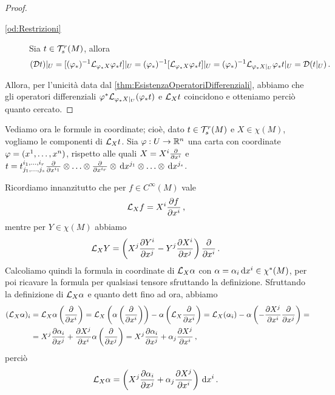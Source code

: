 \begin{proof}
\begin{description}
	\item [\ref{od:Restrizioni}]
		Sia $t\in\Tau_s^r(M)$, allora
		\begin{equation*}
			(\mathcal Dt)\restrict U = [(\varphi_*)^{-1} \Lie_{\varphi_*X}\varphi_*t]\restrict U 
			= (\varphi_*)^{-1}[\Lie_{\varphi_*X}\varphi_*t]\restrict U 
			= (\varphi_*)^{-1} \Lie_{\varphi_*X\restrict U}\varphi_*t \restrict U = \mathcal D(t\restrict U) \punto
		\end{equation*}
	\end{description}
	
	Allora, per l'unicità data dal \cref{thm:EsistenzaOperatoriDifferenziali}, abbiamo che gli operatori differenziali $\varphi^*\Lie_{\varphi_*X\restrict U}(\varphi_*t)$ e $\Lie_Xt$ coincidono e otteniamo perciò quanto cercato.
\end{proof}

Vediamo ora le formule in coordinate; cioè, dato $t\in\Tau_s^r(M)$ e $X\in\chi(M)$, vogliamo le componenti di $\Lie_Xt$.
Sia $\varphi: U \to \R^n$ una carta con coordinate $\varphi=(\seqa xn,)$, rispetto alle quali $X= X^i\DerParz{}{x^i}$ e $t = t^{\seqb ir,}_{\seqb js,} \DerParz{}{x^{i_1}} \otimes \ldots \otimes \DerParz{}{x^{i_r}} \otimes \de x^{j_1} \otimes \ldots \otimes \de x^{j_s}$.

Ricordiamo innanzitutto che per $f \in C^\infty(M)$ vale
\begin{equation*}
\Lie_X f = X^i \DerParz{f}{x^i} \virgola
\end{equation*}
mentre per $Y\in \chi(M)$ abbiamo
\begin{equation*}
\Lie_XY = \left( X^j\DerParz{Y^i}{x^j} - Y^j \DerParz{X^i}{x^j} \right) \DerParz{}{x^i}\punto
\end{equation*}
Calcoliamo quindi la formula in coordinate di $\Lie_X\alpha$ con $\alpha = \alpha_i \de x^i \in \chi^*(M)$, per poi ricavare la formula per qualsiasi tensore sfruttando la definizione. Sfruttando la definizione di $\Lie_X\alpha$ e quanto dett fino ad ora, abbiamo
\begin{align*}
	(\Lie_X\alpha)_i &= \Lie_X\alpha \left(\DerParz{}{x^i}\right) = \Lie_X \left(\alpha\left(\DerParz{}{x^i}\right)\right) - \alpha\left(\Lie_X\DerParz{}{x^i}\right) = \Lie_X(\alpha_i) - \alpha\left( - \DerParz{X^j}{x^i} \DerParz{}{x^j} \right) =  \\
	& = X^j \DerParz{\alpha_i}{x^j} + \DerParz{X^j}{x^i} \alpha\left( \DerParz{}{x^j} \right) = X^j \DerParz{\alpha_i}{x^j} + \alpha_j\DerParz{X^j}{x^i} \virgola
\end{align*}
perciò
\begin{equation*}
	\Lie_X\alpha = \left( X^j \DerParz{\alpha_i}{x^j} + \alpha_j\DerParz{X^j}{x^i} \right) \de x^i \punto
\end{equation*}

